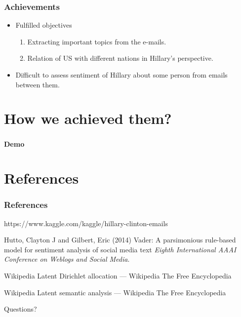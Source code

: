\documentclass{beamer}
\begin{document}

\begin{frame}
	\frametitle{Achievements}
	\begin{itemize}
		\item Fulfilled objectives
		\begin{enumerate}
			\item Extracting important topics from the e-mails.
			\item Relation of US with different nations in Hillary's perspective.
		\end{enumerate}
		\item Difficult to assess sentiment of Hillary about some person from emails between them.
	\end{itemize}
\end{frame}


\section{How we achieved them?}

\begin{frame}
	\frametitle{}
	\begin{center}
		\textbf{Demo}
	\end{center}
\end{frame}

\section{References}

\begin{frame}
	\frametitle{References}
	\footnotesize{
		\begin{thebibliography}{99} %
			 https://www.kaggle.com/kaggle/hillary-clinton-emails
			
			 Hutto, Clayton J and Gilbert, Eric (2014)
			\newblock Vader: A parsimonious rule-based model for sentiment analysis of social media text
			\newblock \emph{Eighth International AAAI Conference on Weblogs and Social Media}.
			
			 Wikipedia
			\newblock Latent Dirichlet allocation --- Wikipedia The Free Encyclopedia
			
			 Wikipedia
			\newblock Latent semantic analysis --- Wikipedia The Free Encyclopedia
		\end{thebibliography}
	}	
\end{frame}


\begin{frame}
	\Huge{\centerline{Questions?}}
\end{frame}


\end{document}

